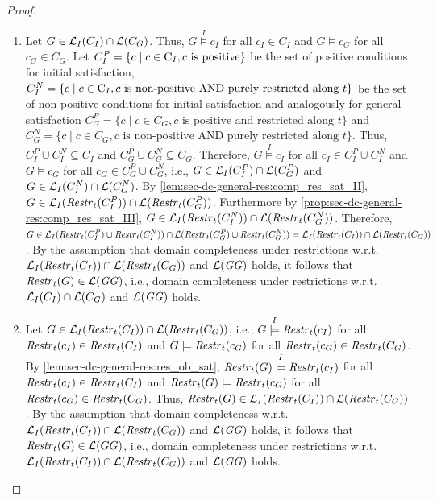 \begin{proof}
\hfill\break
\begin{enumerate}
  \item Let $G \in \mathcal{L}_I(C_I) \cap \mathcal{L}(C_G)$.
  Thus, $G \stackrel{I}{\models} c_I$ for all $c_I \in C_I$ and $G \models c_G$ for all $c_G \in C_G$.
  Let $C^P_I=\{c \mid c \in \mathrm{C}_I,c\text{ is positive}\}$ be the set of positive conditions for initial satisfaction, $C^N_I=\{c \mid c \in \mathrm{C}_I,c \text{ is non-positive AND purely restricted along }t\}$ be the set of non-positive conditions for initial satisfaction and analogously for general satisfaction $C^P_G=\{c \mid c \in C_G,c\text{ is positive and restricted along }t\}$ and $C^N_G=\{c \mid c \in C_G,c \text{ is non-positive AND purely restricted along }t\}$.
  Thus, $C^P_I \cup C^N_I \subseteq C_I$ and $C^P_G \cup C^N_G \subseteq C_G$.
  Therefore, $G \stackrel{I}{\models} c_I$ for all $c_I \in C^P_I \cup C^N_I$ and $G \models c_G$ for all $c_G \in C^P_G \cup C^N_G$, i.e., $G \in \mathcal{L}_I(C^P_I) \cap \mathcal{L}(C^P_G)$ and $G \in \mathcal{L}_I(C^N_I) \cap \mathcal{L}(C^N_G)$.
  By \cref{lem:sec-dc-general-res:comp_res_sat_II}, $G \in \mathcal{L}_I(\mathit{Restr}_t(C^P_I)) \cap \mathcal{L}(\mathit{Restr}_t(C^P_G))$.
  Furthermore by \cref{prop:sec-dc-general-res:comp_res_sat_III}, $G \in \mathcal{L}_I(\mathit{Restr}_t(C^N_I)) \cap \mathcal{L}(\mathit{Restr}_t(C^N_G))$.
  Therefore, $G \in \mathcal{L}_I(\mathit{Restr}_t(C^P_I) \cup \mathit{Restr}_t(C^N_I)) \cap \mathcal{L}(\mathit{Restr}_t(C^P_G) \cup \mathit{Restr}_t(C^N_G))=\mathcal{L}_I(\mathit{Restr}_t(C_I)) \cap \mathcal{L}(\mathit{Restr}_t(C_G))$.
  By the assumption that domain completeness under restrictions w.r.t. $\mathcal{L}_I(\mathit{Restr}_t(C_I)) \cap \mathcal{L}(\mathit{Restr}_t(C_G))$ and $\mathcal{L}(\mathit{GG})$ holds, it follows that $\mathit{Restr}_t(G) \in \mathcal{L}(\mathit{GG})$, i.e., domain completeness under restrictions w.r.t. $\mathcal{L}_I(C_I) \cap \mathcal{L}(C_G)$ and $\mathcal{L}(\mathit{GG})$ holds.
  \item Let $G \in \mathcal{L}_I(\mathit{Restr}_t(C_I)) \cap \mathcal{L}(\mathit{Restr}_t(C_G))$, i.e., $G \stackrel{I}{\models} \mathit{Restr}_t(c_I)$ for all $\mathit{Restr}_t(c_I) \in \mathit{Restr}_t(C_I)$ and $G \models \mathit{Restr}_t(c_G)$ for all $\mathit{Restr}_t(c_G) \in \mathit{Restr}_t(C_G)$.
  By \cref{lem:sec-dc-general-res:res_ob_sat}, $\mathit{Restr}_t(G) \stackrel{I}{\models} \mathit{Restr}_t(c_I)$ for all $\mathit{Restr}_t(c_I) \in \mathit{Restr}_t(C_I)$ and $\mathit{Restr}_t(G) \models \mathit{Restr}_t(c_G)$ for all $\mathit{Restr}_t(c_G) \in \mathit{Restr}_t(C_G)$.
  Thus, $\mathit{Restr}_t(G) \in \mathcal{L}_I(\mathit{Restr}_t(C_I)) \cap \mathcal{L}(\mathit{Restr}_t(C_G))$.
  By the assumption that domain completeness w.r.t. $\mathcal{L}_I(\mathit{Restr}_t(C_I)) \cap \mathcal{L}(\mathit{Restr}_t(C_G))$ and $\mathcal{L}(\mathit{GG})$ holds, it follows that $\mathit{Restr}_t(G) \in \mathcal{L}(GG)$, i.e., domain completeness under restrictions w.r.t. $\mathcal{L}_I(\mathit{Restr}_t(C_I)) \cap \mathcal{L}(\mathit{Restr}_t(C_G))$ and $\mathcal{L}(\mathit{GG})$ holds.
\end{enumerate}
\end{proof}

